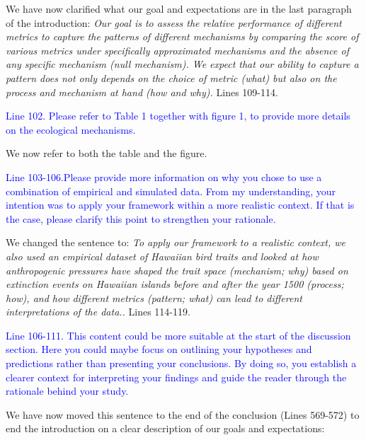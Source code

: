 \documentclass[
]{article}
\begin{document}
We have now clarified what our goal and expectations are in the last paragraph of the introduction:
\textit{Our goal is to assess the relative performance of different metrics to capture the patterns of different mechanisms by comparing the score of various metrics under specifically approximated mechanisms and the absence of any specific mechanism (null mechanism).
We expect that our ability to capture a pattern does not only depends on the choice of metric (what) but also on the process and mechanism at hand (how and why).}
Lines 109-114.

\textcolor{blue}{Line 102. Please refer to Table 1 together with figure 1, to provide more details on the ecological mechanisms.}

We now refer to both the table and the figure.

\textcolor{blue}{Line 103-106.Please provide more information on why you chose to use a combination of empirical and simulated data.
From my understanding, your intention was to apply your framework within a more realistic context.
If that is the case, please clarify this point to strengthen your rationale.}

We changed the sentence to:
\textit{To apply our framework to a realistic context, we also used an empirical dataset of Hawaiian bird traits and looked at how anthropogenic pressures have shaped the trait space (mechanism; why) based on extinction events on Hawaiian islands before and after the year 1500 (process; how), and how different metrics (pattern; what) can lead to different interpretations of the data..}
Lines 114-119.

\textcolor{blue}{Line 106-111.
This content could be more suitable at the start of the discussion section.
Here you could maybe focus on outlining your hypotheses and predictions rather than presenting your conclusions.
By doing so, you establish a clearer context for interpreting your findings and guide the reader through the rationale behind your study.}

We have now moved this sentence to the end of the conclusion (Lines 569-572) to end the introduction on a clear description of our goals and expectations:
\end{document}
